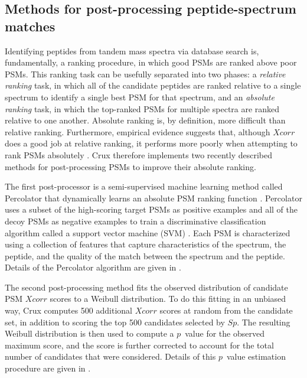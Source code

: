 \documentclass[12pt]{article}
\begin{document}
\subsection{Methods for post-processing peptide-spectrum matches}
\label{section:post-process}

Identifying peptides from tandem mass spectra via database search is,
fundamentally, a ranking procedure, in which good PSMs are ranked
above poor PSMs.  This ranking task can be usefully separated into two
phases: a {\em relative ranking} task, in which all of the candidate
peptides are ranked relative to a single spectrum to identify a single
best PSM for that spectrum, and an {\em absolute ranking} task, in
which the top-ranked PSMs for multiple spectra are ranked relative to
one another.  Absolute ranking is, by definition, more difficult than
relative ranking.  Furthermore, empirical evidence suggests that,
although $Xcorr$ does a good job at relative ranking, it performs more
poorly when attempting to rank PSMs absolutely \cite{keller:empirical,
anderson:new}. Crux therefore implements two recently described
methods for post-processing PSMs to improve their absolute ranking.

The first post-processor is a semi-supervised machine learning method
called Percolator that dynamically learns an absolute PSM ranking
function \cite{kall:semi-supervised}.  Percolator uses a subset of the
high-scoring target PSMs as positive examples and all of the decoy
PSMs as negative examples to train a discriminative classification
algorithm called a support vector machine (SVM) \cite{boser:training,
noble:what}.  Each PSM is characterized using a collection of features
that capture characteristics of the spectrum, the peptide, and the
quality of the match between the spectrum and the peptide.  Details of
the Percolator algorithm are given in \cite{kall:semi-supervised}.

The second post-processing method fits the observed distribution of
candidate PSM $Xcorr$ scores to a Weibull distribution.  To do this
fitting in an unbiased way, Crux computes 500 additional $Xcorr$ scores
at random from the candidate set, in addition to scoring the top 500
candidates selected by $Sp$.  The resulting Weibull distribution is
then used to compute a $p$~value for the observed maximum score, and
the score is further corrected to account for the total number of
candidates that were considered.  Details of this $p$~value estimation
procedure are given in \cite{klammer:not}.
\end{document}
